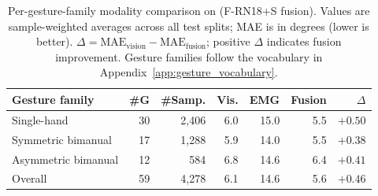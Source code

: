 \begin{table}[h]
\centering
\caption{Per-gesture-family modality comparison on \dataset{} (F-RN18+S fusion). Values are sample-weighted averages across all test splits; MAE is in degrees (lower is better). $\Delta = \text{MAE}_\text{vision} - \text{MAE}_\text{fusion}$; positive $\Delta$ indicates fusion improvement. Gesture families follow the vocabulary in Appendix~\ref{app:gesture_vocabulary}.}
\label{tab:per_gesture_family}
\footnotesize
\setlength{\tabcolsep}{3.8pt}
\renewcommand{\arraystretch}{1.08}
\begin{tabular}{lrrrrrr}
\toprule
Gesture family & \#G & \#Samp. & Vis. & EMG & Fusion & $\Delta$ \\
\midrule
Single-hand & 30 & 2,406 & 6.0 & 15.0 & 5.5 & $\mathbf{+0.50}$ \\
Symmetric bimanual & 17 & 1,288 & 5.9 & 14.0 & 5.5 & $+0.38$ \\
Asymmetric bimanual & 12 & 584 & 6.8 & 14.6 & 6.4 & $+0.41$ \\
\midrule
Overall & 59 & 4,278 & 6.1 & 14.6 & 5.6 & $+0.46$ \\
\bottomrule
\end{tabular}
\end{table}
